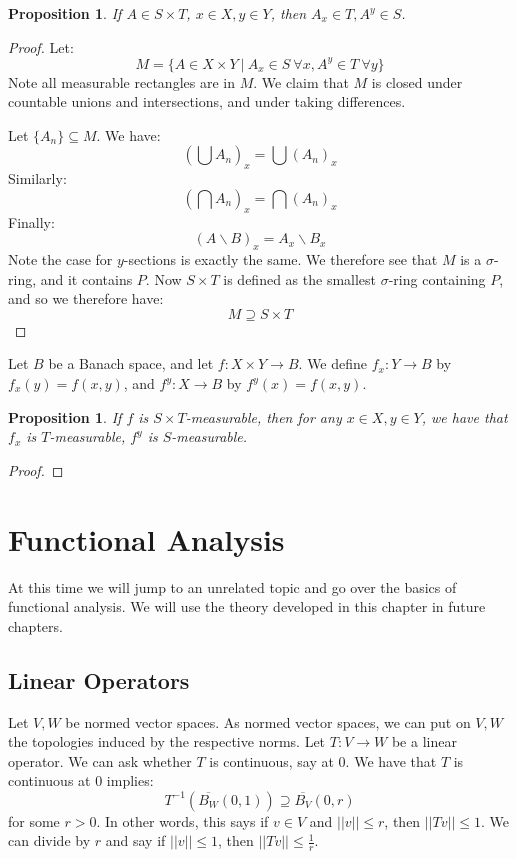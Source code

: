 \documentclass[a4paper,12pt]{report}
\newcommand{\ovl}[1]{\overline{#1}}
\newcommand{\sse} {\subseteq}
\newcommand{\bs} {\backslash}
\newtheorem{prop}[theorem]{Proposition}
\newenvironment{definition}[1][Definition.]{\begin{trivlist}
\item[\hskip \labelsep {\bfseries #1}]}{\end{trivlist}}
\begin{document}
	\begin{prop}
	If $A \in S \times T$, $x \in X, y \in Y$, then $A_x \in T, A^y \in S$. 
	\end{prop}
	\begin{proof}
	Let:
	\[ M = \bigg\{ A \in X \times Y ~\big|~ A_x \in S ~ \forall x, A^y \in T ~ \forall y \bigg\} \]
	Note all measurable rectangles are in $M$. We claim that $M$ is closed under countable unions and intersections, and under taking differences. 
	
	Let $\{A_n\} \sse M$. We have:
	\[ \left( \bigcup A_n \right)_x = \bigcup (A_n)_x \]
	Similarly:
	\[ \left( \bigcap A_n \right)_x = \bigcap (A_n)_x \]
	Finally:
	\[ (A \bs B)_x = A_x \bs B_x \]
	Note the case for $y$-sections is exactly the same. We therefore see that $M$ is a $\sigma$-ring, and it contains $P$. Now $S \times T$ is defined as the smallest $\sigma$-ring containing $P$, and so we therefore have:
	\[ M \supseteq S \times T \]
	\end{proof}
	
	\begin{definition}
	Let $B$ be a Banach space, and let $f : X \times Y \rightarrow B$. We define $f_x : Y \rightarrow B$ by $f_x(y) = f(x, y)$, and $f^y : X \rightarrow B$ by $f^y(x) = f(x, y)$. 
	\end{definition}
	
	\begin{prop}
	If $f$ is $S \times T$-measurable, then for any $x \in X, y \in Y$, we have that $f_x$ is $T$-measurable, $f^y$ is $S$-measurable.
	\end{prop}
	\begin{proof}
	
	\end{proof}
	
	
	
	\chapter{Functional Analysis}
	At this time we will jump to an unrelated topic and go over the basics of functional analysis. We will use the theory developed in this chapter in future chapters. 
	
	\section{Linear Operators}
	
	Let $V, W$ be normed vector spaces. As normed vector spaces, we can put on $V, W$ the topologies induced by the respective norms. Let $T : V \rightarrow W$ be a linear operator. We can ask whether $T$ is continuous, say at 0. 
	We have that $T$ is continuous at 0 implies:
	\[ T^{-1}(\ovl{B_W}(0, 1)) \supseteq \ovl{B_V}(0, r) \]
	for some $r > 0$. In other words, this says if $v \in V$ and $||v|| \leq r$, then $||Tv|| \leq 1$. We can divide by $r$ and say if $||v|| \leq 1$, then $||Tv|| \leq \frac{1}{r}$. 
	
\end{document}
